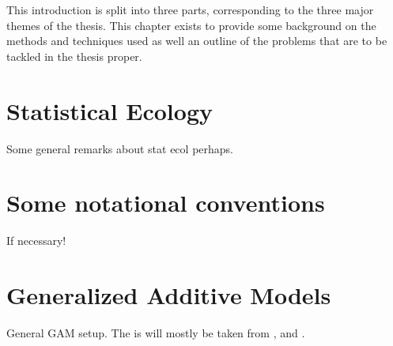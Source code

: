This introduction is split into three parts, corresponding to the three major themes of the thesis. This chapter exists to provide some background on the methods and techniques used as well an outline of the problems that are to be tackled in the thesis proper.

\section{Statistical Ecology}

Some general remarks about stat ecol perhaps.

%
%


\section{Some notational conventions}
If necessary!

\section{Generalized Additive Models}

General GAM setup. The is will mostly be taken from \cite{simonbook}, \cite{rwc} and \cite{marraradice2010}.

